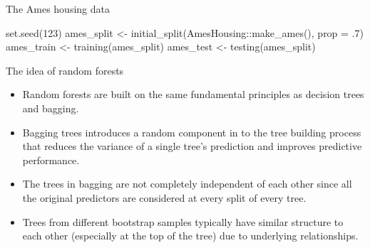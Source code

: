 \documentclass[
  10pt,
  ignorenonframetext,
]{beamer}
\newenvironment{Shaded}{}{}
\newcommand{\DataTypeTok}[1]{#1}
\newcommand{\DecValTok}[1]{#1}
\newcommand{\FloatTok}[1]{#1}
\newcommand{\KeywordTok}[1]{\textcolor[rgb]{0.00,0.00,1.00}{#1}}
\newcommand{\NormalTok}[1]{#1}
\newcommand{\OperatorTok}[1]{#1}
\newcommand{\StringTok}[1]{\textcolor[rgb]{0.00,0.50,0.50}{#1}}
\providecommand{\tightlist}{%
  \setlength{\itemsep}{0pt}\setlength{\parskip}{0pt}}
\begin{document}
\begin{frame}[fragile]{The Ames housing data}
\protect\hypertarget{the-ames-housing-data}{}

\begin{Shaded}
\begin{Highlighting}[]
\KeywordTok{set.seed}\NormalTok{(}\DecValTok{123}\NormalTok{)}
\NormalTok{ames_split <-}\StringTok{ }\KeywordTok{initial_split}\NormalTok{(AmesHousing}\OperatorTok{::}\KeywordTok{make_ames}\NormalTok{(), }\DataTypeTok{prop =} \FloatTok{.7}\NormalTok{)}
\NormalTok{ames_train <-}\StringTok{ }\KeywordTok{training}\NormalTok{(ames_split)}
\NormalTok{ames_test  <-}\StringTok{ }\KeywordTok{testing}\NormalTok{(ames_split)}
\end{Highlighting}
\end{Shaded}

\end{frame}

\begin{frame}{The idea of random forests}
\protect\hypertarget{the-idea-of-random-forests}{}

\begin{itemize}
\tightlist
\item
  Random forests are built on the same fundamental principles as
  decision trees and bagging.
\item
  Bagging trees introduces a random component in to the tree building
  process that reduces the variance of a single tree's prediction and
  improves predictive performance.
\item
  The trees in bagging are not completely independent of each other
  since all the original predictors are considered at every split of
  every tree.
\item
  Trees from different bootstrap samples typically have similar
  structure to each other (especially at the top of the tree) due to
  underlying relationships.
\end{itemize}

\end{frame}
\end{document}
